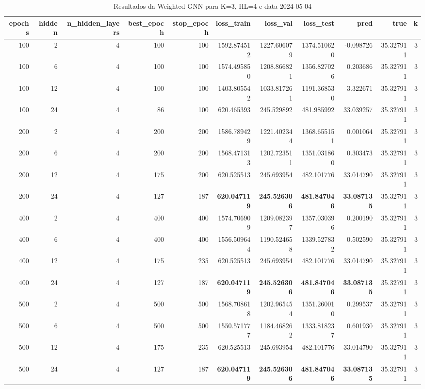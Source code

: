 \begin{table}
\caption{Resultados da Weighted GNN para K=3, HL=4 e data 2024-05-04}
\label{tab:weighted_gnn_results_k3_hl4_d20240504}
\begin{tabular}{rrrrrrrrrrr}
\toprule
epochs & hidden & n\_hidden\_layers & best\_epoch & stop\_epoch & loss\_train & loss\_val & loss\_test & pred & true & k \\
\midrule
100 & 2 & 4 & 100 & 100 & 1592.874512 & 1227.606079 & 1374.510620 & -0.098726 & 35.327911 & 3 \\
100 & 6 & 4 & 100 & 100 & 1574.495850 & 1208.866821 & 1356.827026 & 0.203686 & 35.327911 & 3 \\
100 & 12 & 4 & 100 & 100 & 1403.805542 & 1033.817261 & 1191.368530 & 3.322671 & 35.327911 & 3 \\
100 & 24 & 4 & 86 & 100 & 620.465393 & 245.529892 & 481.985992 & 33.039257 & 35.327911 & 3 \\
200 & 2 & 4 & 200 & 200 & 1586.789429 & 1221.402344 & 1368.655151 & 0.001064 & 35.327911 & 3 \\
200 & 6 & 4 & 200 & 200 & 1568.471313 & 1202.723511 & 1351.031860 & 0.303473 & 35.327911 & 3 \\
200 & 12 & 4 & 175 & 200 & 620.525513 & 245.693954 & 482.101776 & 33.014790 & 35.327911 & 3 \\
200 & 24 & 4 & 127 & 187 & \textbf{620.047119} & \textbf{245.526306} & \textbf{481.847046} & \textbf{33.087135} & 35.327911 & 3 \\
400 & 2 & 4 & 400 & 400 & 1574.706909 & 1209.082397 & 1357.030396 & 0.200190 & 35.327911 & 3 \\
400 & 6 & 4 & 400 & 400 & 1556.509644 & 1190.524658 & 1339.527832 & 0.502590 & 35.327911 & 3 \\
400 & 12 & 4 & 175 & 235 & 620.525513 & 245.693954 & 482.101776 & 33.014790 & 35.327911 & 3 \\
400 & 24 & 4 & 127 & 187 & \textbf{620.047119} & \textbf{245.526306} & \textbf{481.847046} & \textbf{33.087135} & 35.327911 & 3 \\
500 & 2 & 4 & 500 & 500 & 1568.708618 & 1202.965454 & 1351.260010 & 0.299537 & 35.327911 & 3 \\
500 & 6 & 4 & 500 & 500 & 1550.571777 & 1184.468262 & 1333.818237 & 0.601930 & 35.327911 & 3 \\
500 & 12 & 4 & 175 & 235 & 620.525513 & 245.693954 & 482.101776 & 33.014790 & 35.327911 & 3 \\
500 & 24 & 4 & 127 & 187 & \textbf{620.047119} & \textbf{245.526306} & \textbf{481.847046} & \textbf{33.087135} & 35.327911 & 3 \\

\end{tabular}
\end{table}
